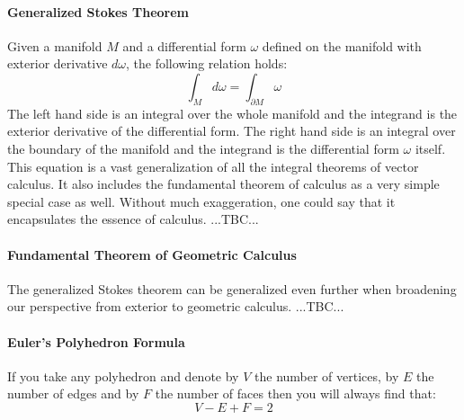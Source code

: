 \paragraph{Generalized Stokes Theorem}
Given a manifold $M$ and a differential form $\omega$ defined on the manifold with exterior derivative $d \omega$, the following relation holds:
\begin{equation}
\int_{M} d \omega = \int_{\partial M} \omega
\end{equation}
The left hand side is an integral over the whole manifold and the integrand is the exterior derivative of the differential form. The right hand side is an integral over the boundary of the manifold and the integrand is the differential form $\omega$ itself. This equation is a vast generalization of all the integral theorems of vector calculus. It also includes the fundamental theorem of calculus as a very simple special case as well. Without much exaggeration, one could say that it encapsulates the essence of calculus. ...TBC...



\paragraph{Fundamental Theorem of Geometric Calculus}
The generalized Stokes theorem can be generalized even further when broadening our perspective from exterior to geometric calculus. ...TBC...


\paragraph{Euler's Polyhedron Formula}
If you take any polyhedron and denote by $V$ the number of vertices, by $E$ the number of edges and by $F$ the number of faces then you will always find that:
\begin{equation}
V - E + F = 2
\end{equation}




